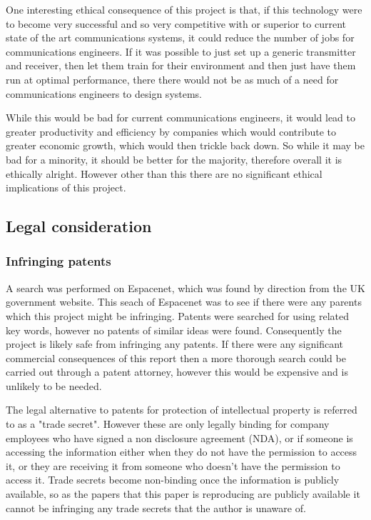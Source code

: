 \documentclass[12pt,onecolumn,letterpaper]{article}
\begin{document}
One interesting ethical consequence of this project is that, if this technology were to become very successful and so very competitive with or superior to current state of the art communications systems, it could reduce the number of jobs for communications engineers. If it was possible to just set up a generic transmitter and receiver, then let them train for their environment and then just have them run at optimal performance, there there would not be as much of a need for communications engineers to design systems.

While this would be bad for current communications engineers, it would lead to greater productivity and efficiency by companies which would contribute to greater economic growth, which would then trickle back down. So while it may be bad for a minority, it should be better for the majority, therefore overall it is ethically alright. However other than this there are no significant ethical implications of this project.

\subsection{Legal consideration}

\subsubsection{Infringing patents}

A search was performed on Espacenet, which was found by direction from the UK government website. This seach of Espacenet was to see if there were any parents which this project might be infringing. Patents were searched for using related key words, however no patents of similar ideas were found. Consequently the project is likely safe from infringing any patents. If there were any significant commercial consequences of this report then a more thorough search could be carried out through a patent attorney, however this would be expensive and is unlikely to be needed.

The legal alternative to patents for protection of intellectual property is referred to as a "trade secret". However these are only legally binding for company employees who have signed a non disclosure agreement (NDA), or if someone is accessing the information either when they do not have the permission to access it, or they are receiving it from someone who doesn't have the permission to access it. Trade secrets become non-binding once the information is publicly available, so as the papers that this paper is reproducing are publicly available it cannot be infringing any trade secrets that the author is unaware of. 
\end{document}

